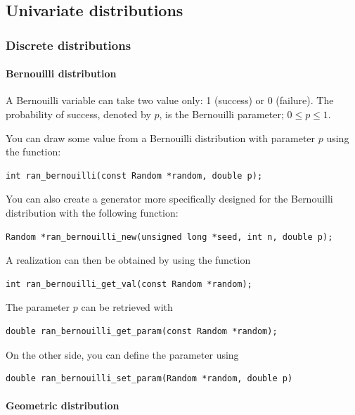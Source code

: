 \subsection{Univariate distributions}

\subsubsection{Discrete distributions}


\paragraph{Bernouilli distribution}

A Bernouilli variable can take two value only: 1 (success) or 0
(failure). The probability of success, denoted by $p$, is the
Bernouilli parameter; $0 \leq p \leq 1$.

You can draw some value from a Bernouilli distribution with parameter $p$
using the function:
\begin{verbatim}
int ran_bernouilli(const Random *random, double p);
\end{verbatim}
You can also create a generator more specifically designed for the
Bernouilli distribution with the following function:
\begin{verbatim}
Random *ran_bernouilli_new(unsigned long *seed, int n, double p);
\end{verbatim}
A realization can then be obtained by using the function
\begin{verbatim}
int ran_bernouilli_get_val(const Random *random);
\end{verbatim}
The parameter $p$ can be retrieved with
\begin{verbatim}
double ran_bernouilli_get_param(const Random *random);
\end{verbatim}
On the other side, you can define the parameter using
\begin{verbatim}
double ran_bernouilli_set_param(Random *random, double p)
\end{verbatim}


\paragraph{Geometric distribution}

